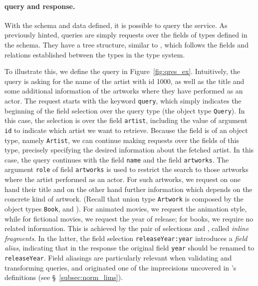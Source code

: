 

\paragraph{\gql query and response.}

With the schema and data defined, it is possible to query the service. 
As previously hinted, \gql queries are simply requests over the fields of types defined in the schema.
They have a tree structure, similar to \json, which follows the fields and relations established between the types
in the type system.

To illustrate this, we define the query in
Figure~\ref{fig:qres_ex}. Intuitively, the query is asking for the
name of the artist with id 1000, as well as the title and some
additional information of the artworks where they have performed as an
actor.  The request starts with the keyword \texttt{query}, which
simply indicates the beginning of the field selection over the query
type (the object type \texttt{Query}).   In this case, the selection is over the field
\texttt{artist}, including the value of argument \texttt{id} to
indicate which artist we want to retrieve.  Because the field is of an
object type, namely \texttt{Artist}, we can continue making requests
over the fields of this type, precisely specifying the desired
information about the fetched artist. In this case, the query
continues with the field \texttt{name} and the field
\texttt{artworks}. The argument \texttt{role} of field
\texttt{artworks} is used to restrict the search to those artworks
where the artist performed as an actor.  For such artworks, we request
on one hand their title and on the other hand further information
which depends on the concrete kind of artwork. (Recall that union type
\texttt{Artwork} is composed by the object types \texttt{Book},
\fiction and \animation). For animated movies, we request the animation
style, while for fictional movies, we request the year of release; for books,
we require no related information. This is achieved by the pair of
selections  and , called {\em inline fragments}. In the
latter, the field selection \texttt{releaseYear:year} introduces a
{\em field alias}, indicating that in the response the original field
\texttt{year} should be renamed to \texttt{releaseYear}. Field
aliasings are particularly relevant when validating and transforming
queries, and originated one of the imprecisions uncovered in \HP's
definitions (see \S~\ref{subsec:norm_lims}).



